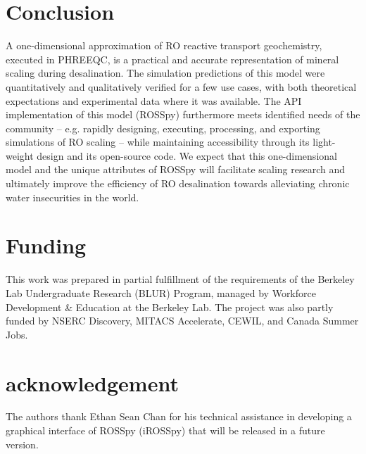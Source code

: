 \section{Conclusion}

A one-dimensional approximation of RO reactive transport geochemistry, executed in PHREEQC, is a practical and accurate representation of mineral scaling during desalination. The simulation predictions of this model were quantitatively and qualitatively verified for a few use cases, with both theoretical expectations and experimental data where it was available. The API implementation of this model (ROSSpy) furthermore meets identified needs of the community -- e.g. rapidly designing, executing, processing, and exporting simulations of RO scaling -- while maintaining accessibility through its light-weight design and its open-source code. We expect that this one-dimensional model and the unique attributes of ROSSpy  will facilitate scaling research and ultimately improve the efficiency of RO desalination towards alleviating chronic water insecurities in the world. 

\section{Funding}
This work was prepared in partial fulfillment of the requirements of the Berkeley Lab Undergraduate Research (BLUR) Program, managed by Workforce Development \& Education at the Berkeley Lab. The project was also partly funded by NSERC Discovery, MITACS Accelerate, CEWIL, and Canada Summer Jobs. 

\section{acknowledgement}
The authors thank Ethan Sean Chan for his technical assistance in developing a graphical interface of ROSSpy (iROSSpy) that will be released in a future version. 